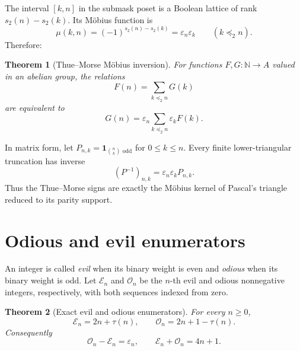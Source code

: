 \documentclass[11pt,oneside]{article}
\newtheorem{theorem}{Theorem}[section]
\theoremstyle{definition}
\theoremstyle{remark}
\newcommand{\N}{\mathbb N}
\newcommand{\wt}{s_2}
\newcommand{\eps}{\varepsilon}
\newcommand{\submask}{\mathrel{\preccurlyeq_2}}
\newcommand{\ind}{\mathbf 1}
\begin{document}
The interval \([k,n]\) in the submask poset is a Boolean lattice of rank
\(\wt(n)-\wt(k)\).  Its M\"obius function is
\begin{equation}
  \mu(k,n)=(-1)^{\wt(n)-\wt(k)}=\eps_n\eps_k
  \qquad(k\submask n).                                     \label{eq:boolean-mobius}
\end{equation}
Therefore:

\begin{theorem}[Thue--Morse M\"obius inversion]
\label{thm:boolean-mobius}
For functions \(F,G:\N\to A\) valued in an abelian group, the relations
\begin{equation}
  F(n)=\sum_{k\submask n}G(k)                               \label{eq:boolean-zeta}
\end{equation}
are equivalent to
\begin{equation}
  \boxed{G(n)=\eps_n\sum_{k\submask n}\eps_kF(k).}         \label{eq:boolean-inversion}
\end{equation}
\end{theorem}

In matrix form, let
\(P_{n,k}=\ind_{\binom nk\text{ odd}}\) for \(0\le k\le n\).  Every finite lower-triangular
truncation has inverse
\begin{equation}
  (P^{-1})_{n,k}=\eps_n\eps_kP_{n,k}.                        \label{eq:pascal-parity-inverse}
\end{equation}
Thus the Thue--Morse signs are exactly the M\"obius kernel of Pascal's triangle reduced to
its parity support.

\section{Odious and evil enumerators}
\label{sec:odious}

An integer is called \emph{evil} when its binary weight is even and \emph{odious} when its
binary weight is odd.  Let \(\mathcal E_n\) and \(\mathcal O_n\) be the \(n\)-th evil and
odious nonnegative integers, respectively, with both sequences indexed from zero.

\begin{theorem}[Exact evil and odious enumerators]
\label{thm:evil-odious-enumerators}
For every \(n\ge0\),
\begin{equation}
  \boxed{
  \mathcal E_n=2n+\tau(n),
  \qquad
  \mathcal O_n=2n+1-\tau(n).}                               \label{eq:evil-odious-enumerators}
\end{equation}
Consequently
\begin{equation}
  \mathcal O_n-\mathcal E_n=\eps_n,
  \qquad
  \mathcal E_n+\mathcal O_n=4n+1.                          \label{eq:evil-odious-pair}
\end{equation}
\end{theorem}
\end{document}
